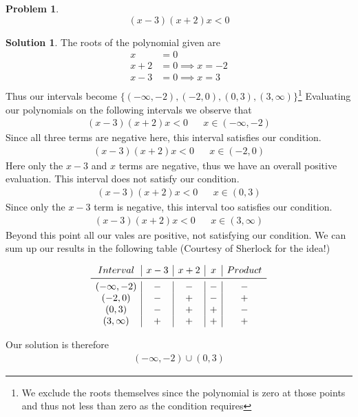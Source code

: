 \documentclass[a4paper]{article}
\theoremstyle{definition}
\newtheorem{problem}{Problem}[section]
\newtheorem*{solution}{Solution}
\begin{document}
\begin{problem}
\[
(x-3)(x+2)x < 0
\]
\end{problem}
\begin{solution}
The roots of the polynomial given are
\begin{align*}
x &= 0 \\
x+2 &= 0 \implies x = -2 \\
x-3 &= 0 \implies x = 3 \\
\end{align*}
Thus our intervals become \(\{(-\infty, -2), (-2, 0), (0, 3), (3, \infty)\}\)\footnote{We exclude the roots themselves since the polynomial is zero at those points and thus not less than zero as the condition requires}
Evaluating our polynomials on the following intervals we observe that
\begin{align*}
(x-3)(x+2)x < 0 &&x \in (-\infty, -2)
\end{align*}
Since all three terms are negative here, this interval satisfies our condition.
\begin{align*}
(x-3)(x+2)x < 0 &&x \in (-2, 0)
\end{align*}
Here only the \(x-3\) and \(x\) terms are negative, thus we have an overall positive evaluation. This interval does not satisfy our condition.
\begin{align*}
(x-3)(x+2)x < 0 &&x \in (0, 3)
\end{align*}
Since only the \(x-3\) term is negative, this interval too satisfies our condition.
\begin{align*}
(x-3)(x+2)x < 0 &&x \in (3, \infty)
\end{align*}
Beyond this point all our vales are positive, not satisfying our condition.
We can sum up our results in the following table (Courtesy of Sherlock for the idea!)

\[
\begin{array}{c|c|c|c|c}
Interval& x-3 & x+2 & x & Product \\
\midrule
(-\infty, -2) &- & - & - & - \\
(-2, 0) &- & + & - & + \\
(0,3) &- & + & + & - \\
(3, \infty) &+ & + & + & + 
\end{array}
\]

Our solution is therefore
\begin{align*}
(-\infty, -2) \cup (0, 3)
\end{align*}
\end{solution}
\end{document}
